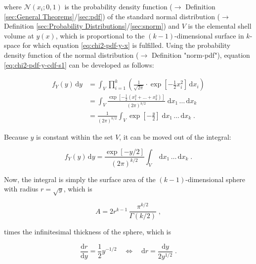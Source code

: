 \documentclass[a4paper,12pt,twoside]{book}
\begin{document}
where $\mathcal{N}(x_i; 0, 1)$ is the probability density function ($\rightarrow$ Definition \ref{sec:General Theorems}/\ref{sec:pdf}) of the standard normal distribution ($\rightarrow$ Definition \ref{sec:Probability Distributions}/\ref{sec:snorm}) and $V$ is the elemental shell volume at $y(x)$, which is proportional to the $(k-1)$-dimensional surface in $k$-space for which equation \eqref{eq:chi2-pdf-y-x} is fulfilled. Using the probability density function of the normal distribution ($\rightarrow$ Definition "norm-pdf"), equation \eqref{eq:chi2-pdf-y-cdf-s1} can be developed as follows:

\begin{equation} \label{eq:chi2-pdf-y-cdf-s2}
\begin{split}
f_Y(y) \, \mathrm{d}y &= \int_{V} \prod_{i=1}^{k} \left( \frac{1}{\sqrt{2 \pi}} \cdot \exp \left[ -\frac{1}{2} x_i^2 \right] \, \mathrm{d}x_i \right) \\
&= \int_{V} \frac{\exp \left[ -\frac{1}{2} \left( x_1^2 + \ldots + x_k^2 \right) \right]}{(2 \pi)^{k/2}} \; \mathrm{d}x_1 \, \ldots \, \mathrm{d}x_k \\
&= \frac{1}{(2 \pi)^{k/2}} \int_{V} \exp \left[ -\frac{y}{2} \right] \; \mathrm{d}x_1 \, \ldots \, \mathrm{d}x_k \; .
\end{split}
\end{equation}

Because $y$ is constant within the set $V$, it can be moved out of the integral:

\begin{equation} \label{eq:chi2-pdf-y-cdf-s3}
f_Y(y) \, \mathrm{d}y = \frac{\exp \left[ -y/2 \right]}{(2 \pi)^{k/2}} \int_{V} \; \mathrm{d}x_1 \, \ldots \, \mathrm{d}x_k \; .
\end{equation}

Now, the integral is simply the surface area of the $(k-1)$-dimensional sphere with radius $r = \sqrt{y}$, which is

\begin{equation} \label{eq:chi2-pdf-A}
A = 2 r^{k-1} \, \frac{\pi^{k/2}}{\Gamma(k/2)} \; ,
\end{equation}

times the infinitesimal thickness of the sphere, which is

\begin{equation} \label{eq:chi2-pdf-dR}
\frac{\mathrm{d}r}{\mathrm{d}y} = \frac{1}{2} y^{-1/2} \quad \Leftrightarrow \quad \mathrm{d}r = \frac{\mathrm{d}y}{2 y^{1/2}} \; .
\end{equation}
\end{document}
